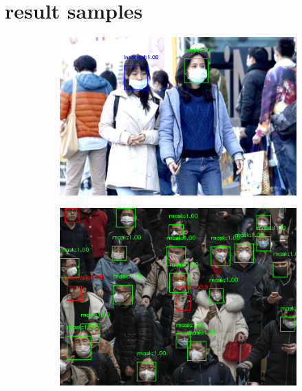 \documentclass[10pt,a4paper]{report}
\begin{document}
\chapter{result samples}

\begin{figure}[hbtp]
     \centering
     \begin{subfigure}[b]{0.45\textwidth}
         \centering
         \includegraphics[width=\textwidth]{./imgs/good/maksssksksss756.png}
     \end{subfigure}
     \hfill
     \begin{subfigure}[b]{0.45\textwidth}
         \centering
         \includegraphics[width=\textwidth]{./imgs/good/maksssksksss795.png}
     \end{subfigure}
     \hfill
     \begin{subfigure}[b]{0.45\textwidth}

\end{subfigure}
\end{figure}
\end{document}
